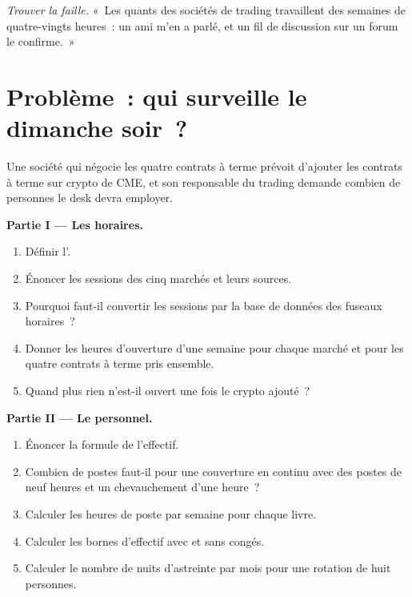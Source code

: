 \begin{exercise}[$\star\star\star$]\label{exo:in:hours-rhythm-and-intensity:8}
\emph{Trouver la faille.} «~Les quants des sociétés de trading travaillent des semaines de quatre-vingts heures~: un ami m'en a parlé, et un fil de discussion
sur un forum le confirme.~»
\end{exercise}

\section{Problème~: qui surveille le dimanche soir~?}

\begin{problem}\label{pb:in:hours-rhythm-and-intensity:1}
Une société qui négocie les quatre contrats à terme prévoit d'ajouter les contrats à terme sur crypto de CME, et son responsable du trading demande combien de personnes le
desk devra employer.

\medskip\noindent\textbf{Partie I --- Les horaires.}
\begin{enumerate}
\item Définir l'.
\item Énoncer les sessions des cinq marchés et leurs sources.
\item Pourquoi faut-il convertir les sessions par la base de données des fuseaux horaires~?
\item Donner les heures d'ouverture d'une semaine pour chaque marché et pour les quatre contrats à terme pris ensemble.
\item Quand plus rien n'est-il ouvert une fois le crypto ajouté~?
\end{enumerate}

\medskip\noindent\textbf{Partie II --- Le personnel.}
\begin{enumerate}[resume]
\item Énoncer la formule de l'effectif.
\item Combien de postes faut-il pour une couverture en continu avec des postes de neuf heures et un chevauchement d'une heure~?
\item Calculer les heures de poste par semaine pour chaque livre.
\item Calculer les bornes d'effectif avec et sans congés.
\item Calculer le nombre de nuits d'astreinte par mois pour une rotation de huit personnes.
\end{enumerate}


\end{problem}
